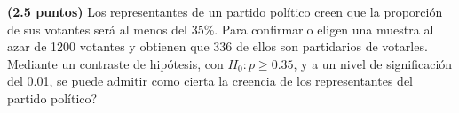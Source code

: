 
\textbf{(2.5 puntos)} Los representantes de un partido político creen que la proporción de sus votantes será al menos del 35\%. Para confirmarlo eligen una muestra al azar de 1200 votantes y obtienen que 336 de ellos son partidarios de votarles. Mediante un contraste de hipótesis, con $H_0:p\geq0.35$, y a un nivel de significación del 0.01, \textquestiondown{}se puede admitir como cierta la creencia de los representantes del partido político?

